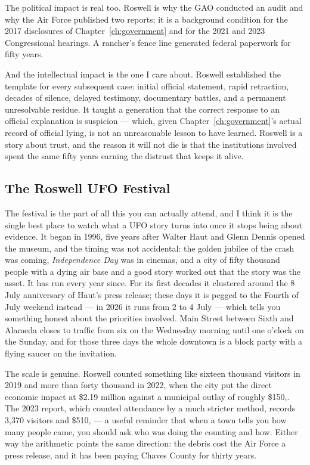 The political impact is real too. Roswell is why the GAO conducted an audit and why the Air Force
published two reports; it is a background condition for the 2017 disclosures of Chapter~\ref{ch:government} and for
the 2021 and 2023 Congressional hearings. A rancher's fence line generated federal paperwork for
fifty years.

And the intellectual impact is the one I care about. Roswell established the template for every
subsequent case: initial official statement, rapid retraction, decades of silence, delayed
testimony, documentary battles, and a permanent unresolvable residue. It taught a generation that
the correct response to an official explanation is suspicion --- which, given Chapter~\ref{ch:government}'s actual
record of official lying, is not an unreasonable lesson to have learned. Roswell is a story about
trust, and the reason it will not die is that the institutions involved spent the same fifty years
earning the distrust that keeps it alive.

\subsection{The Roswell UFO Festival}

The festival is the part of all this you can actually attend, and I think it is the single best place
to watch what a UFO story turns into once it stops being about evidence. It began in 1996, five years
after Walter Haut and Glenn Dennis opened the museum, and the timing was not accidental: the golden
jubilee of the crash was coming, \emph{Independence Day} was in cinemas, and a city of fifty thousand
people with a dying air base and a good story worked out that the story was the asset. It has run
every year since. For its first decades it clustered around the 8 July anniversary of Haut's press
release; these days it is pegged to the Fourth of July weekend instead --- in 2026 it runs from 2 to
4 July --- which tells you something honest about the priorities involved. Main Street between Sixth
and Alameda closes to traffic from six on the Wednesday morning until one o'clock on the Sunday, and
for those three days the whole downtown is a block party with a flying saucer on the invitation.

The scale is genuine. Roswell counted something like sixteen thousand visitors in 2019 and more than
forty thousand in 2022, when the city put the direct economic impact at \$2.19 million against a
municipal outlay of roughly \$150,. The 2023 report, which counted attendance by a much stricter
method, records 3,370 visitors and \$510, --- a useful reminder that when a town tells you how
many people came, you should ask who was doing the counting and how. Either way the arithmetic points
the same direction: the debris cost the Air Force a press release, and it has been paying Chaves
County for thirty years.

